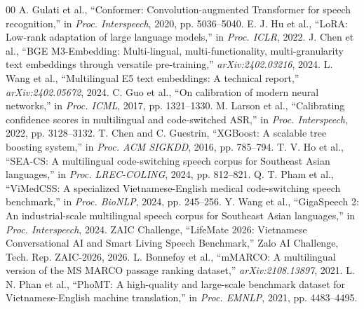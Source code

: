 \documentclass[9pt, conference, a4paper, compsocconf]{IEEEtran}
\begin{document}
\begin{thebibliography}{00}
 A. Gulati et al., ``Conformer: Convolution-augmented Transformer for speech recognition,'' in \textit{Proc. Interspeech}, 2020, pp. 5036--5040.
 E. J. Hu et al., ``LoRA: Low-rank adaptation of large language models,'' in \textit{Proc. ICLR}, 2022.
 J. Chen et al., ``BGE M3-Embedding: Multi-lingual, multi-functionality, multi-granularity text embeddings through versatile pre-training,'' \textit{arXiv:2402.03216}, 2024.
 L. Wang et al., ``Multilingual E5 text embeddings: A technical report,'' \textit{arXiv:2402.05672}, 2024.
 C. Guo et al., ``On calibration of modern neural networks,'' in \textit{Proc. ICML}, 2017, pp. 1321--1330.
 M. Larson et al., ``Calibrating confidence scores in multilingual and code-switched ASR,'' in \textit{Proc. Interspeech}, 2022, pp. 3128--3132.
 T. Chen and C. Guestrin, ``XGBoost: A scalable tree boosting system,'' in \textit{Proc. ACM SIGKDD}, 2016, pp. 785--794.
 T. V. Ho et al., ``SEA-CS: A multilingual code-switching speech corpus for Southeast Asian languages,'' in \textit{Proc. LREC-COLING}, 2024, pp. 812--821.
 Q. T. Pham et al., ``ViMedCSS: A specialized Vietnamese-English medical code-switching speech benchmark,'' in \textit{Proc. BioNLP}, 2024, pp. 245--256.
 Y. Wang et al., ``GigaSpeech 2: An industrial-scale multilingual speech corpus for Southeast Asian languages,'' in \textit{Proc. Interspeech}, 2024.
 ZAIC Challenge, ``LifeMate 2026: Vietnamese Conversational AI and Smart Living Speech Benchmark,'' Zalo AI Challenge, Tech. Rep. ZAIC-2026, 2026.
 L. Bonnefoy et al., ``mMARCO: A multilingual version of the MS MARCO passage ranking dataset,'' \textit{arXiv:2108.13897}, 2021.
 L. N. Phan et al., ``PhoMT: A high-quality and large-scale benchmark dataset for Vietnamese-English machine translation,'' in \textit{Proc. EMNLP}, 2021, pp. 4483--4495.
\end{thebibliography}
\end{document}
